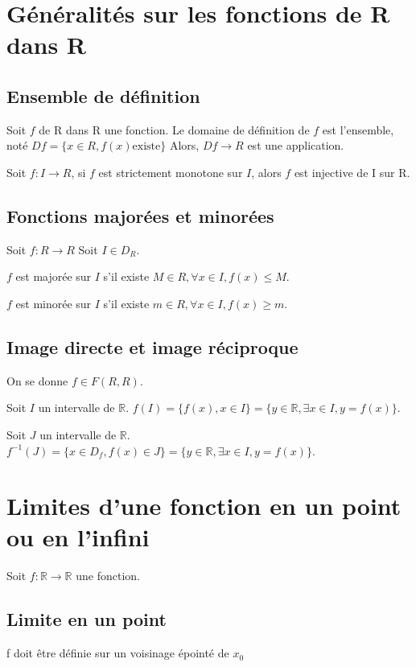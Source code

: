 \documentclass[french]{yLectureNote}
\begin{document}
\section{Généralités sur les fonctions de R dans R}
\subsection{Ensemble de définition}

\begin{theorem}
Soit $f$ de R dans R une fonction. Le domaine de définition de $f$ est l'ensemble, noté $Df = \{x\in R, f(x) \text{existe}\}$ Alors, $Df\rightarrow R$ est une application.
\end{theorem}

\begin{theorem}[Proposition]
Soit $f : I\rightarrow R$, si $f$ est strictement monotone sur $I$, alors $f$ est injective de I sur R.
\end{theorem}

\subsection{Fonctions majorées et minorées}
Soit $f : R\rightarrow R$ Soit $I\in D_R$.

$f$ est majorée sur $I$ s'il existe $M\in R,\forall x\in I, f(x) \leq M$.

$f$ est minorée sur $I$ s'il existe $m\in R,\forall x\in I, f(x) \geq m$.

\subsection{Image directe et image réciproque}
On se donne $f \in F(R,R)$.

Soit $I$ un intervalle de $\mathbb{R}$. $f(I) = \{f(x), x\in I\} = \{y\in\mathbb{R},\exists x\in I, y = f(x)\}$.

Soit $J$ un intervalle de $\mathbb{R}$. $f^{-1}(J) = \{ x\in D_f, f(x)\in J\} = \{y\in\mathbb{R},\exists x\in I, y = f(x)\}$.
\section{Limites d'une fonction en un point ou en l'infini}
Soit $f : \mathbb{R} \rightarrow \mathbb{R}$ une fonction.
\subsection{Limite en un point}
f doit \^etre définie sur un voisinage épointé de $x_0$
\end{document}
